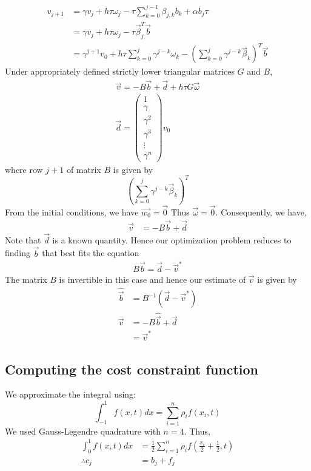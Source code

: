 \documentclass{ifacconf}
\begin{document}
\begin{align} \label{eq:p0evolution}
v_{j+1} &= \gamma v_j + h\tau\omega_j - \tau\sum_{k=0}^{j-1}\beta_{j,k}b_k
	   + \alpha b_j\tau \\
	   &= \gamma v_j + h\tau\omega_j - \tau \vec{\beta}_j^T \vec{b}\\
	   &= \gamma^{j+1}v_0 
	   + h\tau\sum_{k=0}^{j} \gamma^{j-k}\omega_k
	   - \left(\sum_{k=0}^{j} \gamma^{j-k} \vec{\beta}_k\right)^T \vec{b}
\end{align}
Under appropriately defined strictly lower triangular matrices $G$ and $B$,
\begin{align}
	\vec{v} = - B\vec{b}+\vec{d} + h\tau G\vec{\omega}  \\
	\vec{d}=\begin{pmatrix} 1 \\ \gamma \\  \gamma^2 \\ \gamma^3 \\ \vdots \\ \gamma^{n} \end{pmatrix}v_0
\end{align}
where row $j+1$ of matrix $B$ is given by
\[
\left(\sum_{k=0}^{j} \gamma^{j-k} \vec{\beta}_k\right)^T
\]
From the initial conditions, we have $\vec{w_0} = \vec{0}$ Thus $\vec{\omega} =
\vec{0}$. Consequently, we have,
\begin{align}
	\vec{v} &= -B\vec{b} + \vec{d}
\end{align}
Note that $\vec{d}$ is a known quantity.
Hence our optimization problem reduces to finding $\vec{b}$ that best fits the equation
\begin{align}
	B\vec{b} = \vec{d}-\vec{v}^*
\end{align}
The matrix $B$ is invertible in this case and hence our estimate of $\vec{v}$ is given by 
\begin{align}
	\hat{\vec{b}} &= B^{-1} \left( \vec{d} - \vec{v}^* \right)\\
	\vec{v} &= -B\hat{\vec{b}} + \vec{d} \\
	        &= \vec{v}^*
\end{align}

\subsection{Computing the cost constraint function}
We approximate the integral using:
\begin{equation}
\int_{-1}^{1}f(x,t)dx = \sum_{i=1}^{n} \rho_if(x_i,t)
\end{equation}
We used Gauss-Legendre quadrature with $n=4$.
Thus,
\begin{align}
	\int_{0}^{1}f(x,t)dx &= \frac{1}{2}\sum_{i=1}^{n} \rho_if\left(\frac{x_i}{2} +
	\frac{1}{2},t\right)\\
	\therefore c_j &= b_j + f_j
\end{align}
\end{document}
